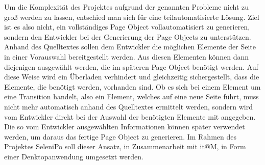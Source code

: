 Um die Komplexität des Projektes aufgrund der genannten Probleme nicht zu groß werden zu lassen, entschied man sich für eine teilautomatisierte Lösung.
Ziel ist es also nicht, ein vollständiges Page Object vollautomatisiert zu generieren, sondern den Entwickler bei der Generierung der Page Objects zu unterstützen. Anhand des Quelltextes sollen dem Entwickler die möglichen Elemente der Seite in einer Vorauswahl bereitgestellt werden. Aus diesen Elementen können dann diejenigen ausgewählt werden, die im späteren Page Object benötigt werden. Auf diese Weise wird ein Überladen verhindert und gleichzeitig sichergestellt, dass die Elemente, die benötigt werden, vorhanden sind.
Ob es sich bei einem Element um eine Transition handelt, also ein Element, welches auf eine neue Seite führt, muss nicht mehr automatisch anhand des Quelltextes ermittelt werden, sondern wird vom Entwickler direkt bei der Auswahl der benötigten Elemente mit angegeben.
Die so vom Entwickler ausgewählten Informationen können später verwendet werden, um daraus das fertige Page Object zu generieren.
Im Rahmen des Projektes SeleniPo soll dieser Ansatz, in Zusammenarbeit mit it@M, in Form einer Denktopanwendung umgesetzt werden. 

